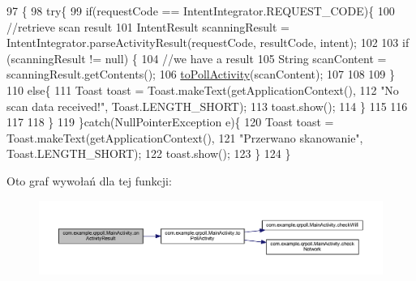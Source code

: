 \begin{DoxyCode}
97                                                                                  \{
98         \textcolor{keywordflow}{try}\{
99         \textcolor{keywordflow}{if}(requestCode == IntentIntegrator.REQUEST\_CODE)\{
100             \textcolor{comment}{//retrieve scan result}
101             IntentResult scanningResult = IntentIntegrator.parseActivityResult(requestCode, resultCode, 
      intent);
102             
103             \textcolor{keywordflow}{if} (scanningResult != null) \{
104                 \textcolor{comment}{//we have a result}
105                 String scanContent = scanningResult.getContents();
106                 \hyperlink{classcom_1_1example_1_1qrpoll_1_1_main_activity_ac108fe2528d7657f970d61d49639e6ac}{toPollActivity}(scanContent);
107                 
108                 
109             \}
110             \textcolor{keywordflow}{else}\{
111                 Toast toast = Toast.makeText(getApplicationContext(),
112                     \textcolor{stringliteral}{"No scan data received!"}, Toast.LENGTH\_SHORT);
113                 toast.show();
114             \}
115             
116             
117                         
118         \}
119         \}\textcolor{keywordflow}{catch}(NullPointerException e)\{
120             Toast toast = Toast.makeText(getApplicationContext(),
121                     \textcolor{stringliteral}{"Przerwano skanowanie"}, Toast.LENGTH\_SHORT);
122                 toast.show();
123         \}
124     \}
\end{DoxyCode}


Oto graf wywołań dla tej funkcji\+:
\nopagebreak
\begin{figure}[H]
\begin{center}
\leavevmode
\includegraphics[width=350pt]{classcom_1_1example_1_1qrpoll_1_1_main_activity_ab7dc0b400a4156ce07ec51712c638b5b_cgraph}
\end{center}
\end{figure}



